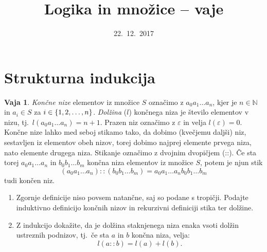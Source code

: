 \documentclass{article}
\newcommand{\NN}{\mathbb{N}}
\theoremstyle{definition}
\newtheorem{vaja}{Vaja}
\begin{document}
\title{Logika in množice -- vaje}
\date{22.~12.~2017}
\maketitle


\section{Strukturna indukcija}

\begin{vaja}
	\emph{Končne nize} elementov iz množice $S$ označimo z $a_0 a_1 \ldots a_n$, kjer je $n \in \NN$ in $a_i \in S$ za $i\in \set{1, 2, \ldots, n}$. \emph{Dolžina} ($l$) končnega niza je število elementov v nizu, tj.~$l(a_0 a_1 \ldots a_n) = n + 1$. Prazen niz označimo z $\varepsilon$ in velja $l(\varepsilon) = 0$. Končne nize lahko med seboj stikamo tako, da dobimo (kvečjemu daljši) niz, sestavljen iz elementov obeh nizov, torej dobimo najprej elemente prvega niza, nato elemente drugega niza. Stikanje označimo z dvojnim dvopičjem (::). Če sta torej $a_0a_1 \ldots a_n$ in $b_0 b_1 \ldots b_m$ končna niza elementov iz množice $S$, potem je njun stik
	\[(a_0a_1 \ldots a_n) :: (b_0 b_1 \ldots b_m) = a_0a_1 \ldots a_n b_0 b_1 \ldots b_m\]
	tudi končen niz. 
	\begin{enumerate}
		\item
			Zgornje definicije niso povsem natančne, saj so podane s tropičji. Podajte induktivno definicijo končnih nizov in rekurzivni definiciji stika ter dolžine.
		\item
			Z indukcijo dokažite, da je dolžina staknjenega niza enaka vsoti dolžin ustreznih podnizov, tj.~če sta $a$ in $b$ končna niza, velja:
			\[l(a :: b) = l(a) + l(b).\]
	\end{enumerate}
\end{vaja}

\newpage
\end{document}
